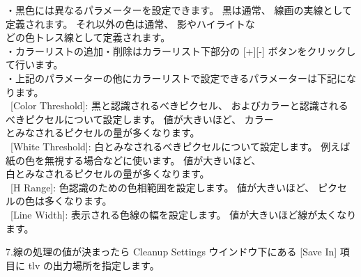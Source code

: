 \documentclass[a4paper,10pt]{article}
\begin{document}
\footnotesize
\noindent ・黒色には異なるパラメーターを設定できます。 黒は通常、 線画の実線として定義されます。 それ以外の色は通常、 影やハイライトな\\
どの色トレス線として定義されます。\\
・カラーリストの追加・削除はカラーリスト下部分の [+][-] ボタンをクリックして行います。\\
・上記のパラメーターの他にカラーリストで設定できるパラメーターは下記になります。\\
\ [Color Threshold]: 黒と認識されるべきピクセル、 およびカラーと認識されるべきピクセルについて設定します。 値が大きいほど、 カラー\\
とみなされるピクセルの量が多くなります。\\
\ [White Threshold]: 白とみなされるべきピクセルについて設定します。 例えば紙の色を無視する場合などに使います。 値が大きいほど、\\
白とみなされるピクセルの量が多くなります。\\
\ [H Range]: 色認識のための色相範囲を設定します。 値が大きいほど、 ピクセルの色は多くなります。\\
\ [Line Width]: 表示される色線の幅を設定します。 値が大きいほど線が太くなります。\\
\par
\small
\noindent 7.線の処理の値が決まったら Cleanup Settings ウインドウ下にある [Save In] 項目に tlv の出力場所を指定します。\\

\newpage 
\end{document}
